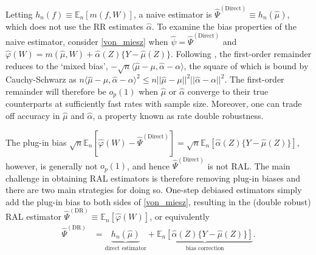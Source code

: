 Letting $h_n(f) \equiv \mathbb{E}_n [m(f, W)]$, a naive estimator is $\hat{\Psi}^{(\text{Direct})} \equiv h_n(\hat{\mu})$, which does not use the RR estimates $\hat{\alpha}$. To examine the bias properties of the naive estimator, consider \eqref{von_miesz} when $\hat{\psi} = \hat{\Psi}^{(\text{Direct})}$ and $\hat{\varphi}(W) = m(\hat{\mu}, W) + \hat{\alpha}(Z)\{Y - \hat{\mu}(Z)\}$. Following \citep{Chernozhukov2020}, the first-order remainder reduces to the `mixed bias', $- \sqrt{n} \langle \hat{\mu} - \mu, \hat{\alpha} - \alpha  \rangle$, the square of which is bound by Cauchy-Schwarz as $n  \langle \hat{\mu} - \mu, \hat{\alpha} - \alpha  \rangle^2 \leq n||\hat{\mu} - \mu||^2 ||\hat{\alpha} - \alpha||^2$. The first-order remainder will therefore be $o_p(1)$ when $\hat{\mu}$ or $\hat{\alpha}$ converge to their true counterparts at sufficiently fast rates with sample size. Moreover, one can trade off accuracy in $\hat{\mu}$ and $\hat{\alpha}$, a property known as rate double robustness.

The plug-in bias $\sqrt{n}\mathbb{E}_n [\hat{\varphi}(W) - \hat{\Psi}^{(\text{Direct})} ] = \sqrt{n}\mathbb{E}_n[\hat{\alpha}(Z)\{Y - \hat{\mu}(Z)\}]$, however, is generally not $o_p(1)$, and hence $\hat{\Psi}^{(\text{Direct})}$ is not RAL. The main challenge in obtaining RAL estimators is therefore removing plug-in biases and there are two main strategies for doing so. One-step debiased estimators simply add the plug-in bias to both sides of \eqref{von_miesz}, resulting in the (double robust) RAL estimator $\hat{\Psi}^{(\text{DR})} \equiv \mathbb{E}_n[\hat{\varphi}(W)]$, or equivalently
\begin{align}
    \hat{\Psi}^{(\text{DR})} &= \underbrace{h_n(\hat{\mu})}_{\text{direct estimator}} + \underbrace{\mathbb{E}_n[\hat{\alpha}(Z)\{Y - \hat{\mu}(Z)\}]}_{\text{bias correction}}. \label{eq_dr}
\end{align}

